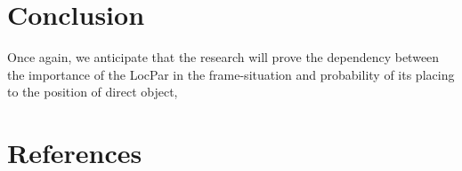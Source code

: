 \section{Conclusion}
Once again, we anticipate that the research will prove the  dependency between the importance of the LocPar in the frame-situation and probability of its placing to the position of direct object, 


\section{References}
\renewcommand{\bibsection}{}
 












